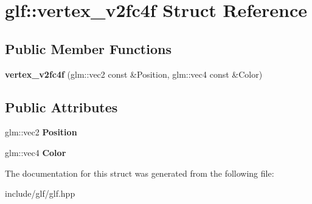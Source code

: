 \hypertarget{structglf_1_1vertex__v2fc4f}{\section{glf\-:\-:vertex\-\_\-v2fc4f \-Struct \-Reference}
\label{structglf_1_1vertex__v2fc4f}
}
\subsection*{\-Public \-Member \-Functions}
\begin{DoxyCompactItemize}
\item 
\hypertarget{structglf_1_1vertex__v2fc4f_afee62ba68a6dc6cdbecb0d4b6840af80}{{\bfseries vertex\-\_\-v2fc4f} (glm\-::vec2 const \&\-Position, glm\-::vec4 const \&\-Color)}\label{structglf_1_1vertex__v2fc4f_afee62ba68a6dc6cdbecb0d4b6840af80}

\end{DoxyCompactItemize}
\subsection*{\-Public \-Attributes}
\begin{DoxyCompactItemize}
\item 
\hypertarget{structglf_1_1vertex__v2fc4f_a3d26dfc8db277e732e854ab5dce53e93}{glm\-::vec2 {\bfseries \-Position}}\label{structglf_1_1vertex__v2fc4f_a3d26dfc8db277e732e854ab5dce53e93}

\item 
\hypertarget{structglf_1_1vertex__v2fc4f_ab91c62bb4566d721c5c72fb48bf8a789}{glm\-::vec4 {\bfseries \-Color}}\label{structglf_1_1vertex__v2fc4f_ab91c62bb4566d721c5c72fb48bf8a789}

\end{DoxyCompactItemize}


\-The documentation for this struct was generated from the following file\-:\begin{DoxyCompactItemize}
\item 
include/glf/glf.\-hpp\end{DoxyCompactItemize}
